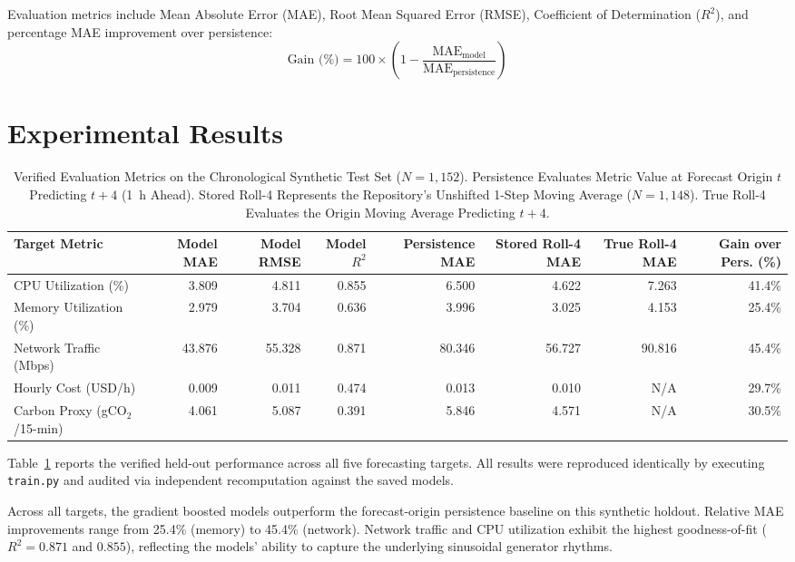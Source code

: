 \documentclass[conference]{IEEEtran}
\begin{document}
Evaluation metrics include Mean Absolute Error (MAE), Root Mean Squared Error (RMSE), Coefficient of Determination ($R^2$), and percentage MAE improvement over persistence:
\begin{equation}
    \text{Gain (\%)} = 100 \times \left(1 - \frac{\text{MAE}_{\text{model}}}{\text{MAE}_{\text{persistence}}}\right)
\end{equation}

\section{Experimental Results}

\begin{table}[t]
\caption{Verified Evaluation Metrics on the Chronological Synthetic Test Set ($N=1{,}152$). Persistence Evaluates Metric Value at Forecast Origin $t$ Predicting $t+4$ (1~h Ahead). Stored Roll-4 Represents the Repository's Unshifted 1-Step Moving Average ($N=1{,}148$). True Roll-4 Evaluates the Origin Moving Average Predicting $t+4$.}
\label{tab:results}
\centering
\footnotesize
\begin{tabular}{lrrrrrrr}
\toprule
\textbf{Target Metric} & \textbf{Model MAE} & \textbf{Model RMSE} & \textbf{Model $R^2$} & \textbf{Persistence MAE} & \textbf{Stored Roll-4 MAE} & \textbf{True Roll-4 MAE} & \textbf{Gain over Pers. (\%)} \\
\midrule
CPU Utilization (\%) & 3.809 & 4.811 & 0.855 & 6.500 & 4.622 & 7.263 & 41.4\% \\
Memory Utilization (\%) & 2.979 & 3.704 & 0.636 & 3.996 & 3.025 & 4.153 & 25.4\% \\
Network Traffic (Mbps) & 43.876 & 55.328 & 0.871 & 80.346 & 56.727 & 90.816 & 45.4\% \\
Hourly Cost (USD/h) & 0.009 & 0.011 & 0.474 & 0.013 & 0.010 & N/A & 29.7\% \\
Carbon Proxy (gCO$_2$/15-min) & 4.061 & 5.087 & 0.391 & 5.846 & 4.571 & N/A & 30.5\% \\
\bottomrule
\end{tabular}
\end{table}

Table~\ref{tab:results} reports the verified held-out performance across all five forecasting targets. All results were reproduced identically by executing \texttt{train.py} and audited via independent recomputation against the saved models.

Across all targets, the gradient boosted models outperform the forecast-origin persistence baseline on this synthetic holdout. Relative MAE improvements range from 25.4\% (memory) to 45.4\% (network). Network traffic and CPU utilization exhibit the highest goodness-of-fit ($R^2 = 0.871$ and $0.855$), reflecting the models' ability to capture the underlying sinusoidal generator rhythms.
\end{document}
